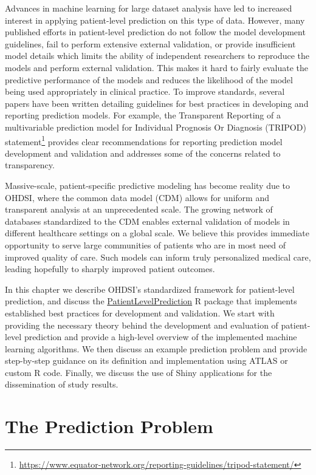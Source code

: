 \documentclass[11pt]{book}
\let\rmarkdownfootnote\footnote%
\def\footnote{\protect\rmarkdownfootnote}
\theoremstyle{definition}
\theoremstyle{definition}
\theoremstyle{definition}
\theoremstyle{remark}
\begin{document}
Advances in machine learning for large dataset analysis have led to
increased interest in applying patient-level prediction on this type of
data. However, many published efforts in patient-level prediction do not
follow the model development guidelines, fail to perform extensive
external validation, or provide insufficient model details which limits
the ability of independent researchers to reproduce the models and
perform external validation. This makes it hard to fairly evaluate the
predictive performance of the models and reduces the likelihood of the
model being used appropriately in clinical practice. To improve
standards, several papers have been written detailing guidelines for
best practices in developing and reporting prediction models. For
example, the Transparent Reporting of a multivariable prediction model
for Individual Prognosis Or Diagnosis (TRIPOD) statement\footnote{\url{https://www.equator-network.org/reporting-guidelines/tripod-statement/}}
provides clear recommendations for reporting prediction model
development and validation and addresses some of the concerns related to
transparency.  

Massive-scale, patient-specific predictive modeling has become reality
due to OHDSI, where the common data model (CDM) allows for uniform and
transparent analysis at an unprecedented scale. The growing network of
databases standardized to the CDM enables external validation of models
in different healthcare settings on a global scale. We believe this
provides immediate opportunity to serve large communities of patients
who are in most need of improved quality of care. Such models can inform
truly personalized medical care, leading hopefully to sharply improved
patient outcomes.

In this chapter we describe OHDSI's standardized framework for
patient-level prediction, \citep{reps2018} and discuss the
\href{https://ohdsi.github.io/PatientLevelPrediction/}{PatientLevelPrediction}
R package that implements established best practices for development and
validation. We start with providing the necessary theory behind the
development and evaluation of patient-level prediction and provide a
high-level overview of the implemented machine learning algorithms. We
then discuss an example prediction problem and provide step-by-step
guidance on its definition and implementation using ATLAS or custom R
code. Finally, we discuss the use of Shiny applications for the
dissemination of study results.

\section{The Prediction Problem}\label{the-prediction-problem}
\end{document}

